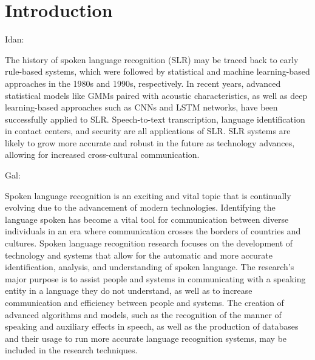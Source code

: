 \documentclass[a4paper]{article}
\begin{document}
\section{Introduction}


Idan:

The history of spoken language recognition (SLR) may be traced back to early rule-based systems, which were followed by statistical and machine learning-based approaches in the 1980s and 1990s, respectively. In recent years, advanced statistical models like GMMs paired with acoustic characteristics, as well as deep learning-based approaches such as CNNs and LSTM networks, have been successfully applied to SLR. Speech-to-text transcription, language identification in contact centers, and security are all applications of SLR. SLR systems are likely to grow more accurate and robust in the future as technology advances, allowing for increased cross-cultural communication.

Gal:

Spoken language recognition is an exciting and vital topic that is continually evolving due to the advancement of modern technologies. Identifying the language spoken has become a vital tool for communication between diverse individuals in an era where communication crosses the borders of countries and cultures. Spoken language recognition research focuses on the development of technology and systems that allow for the automatic and more accurate identification, analysis, and understanding of spoken language. The research’s major purpose is to assist people and systems in communicating with a speaking entity in a language they do not understand, as well as to increase communication and efficiency between people and systems. The creation of advanced algorithms and models, such as the recognition of the manner of speaking and auxiliary effects in speech, as well as the production of databases and their usage to run more accurate language recognition systems, may be included in the research techniques.
\end{document}
